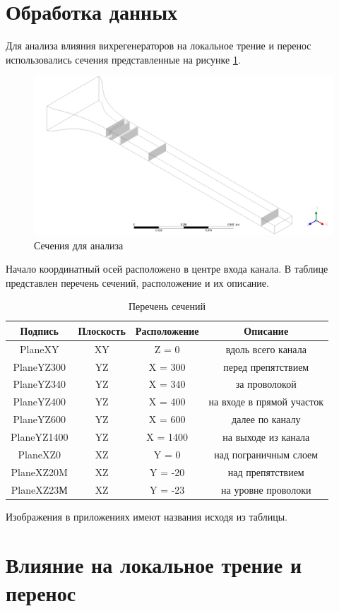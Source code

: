 \section{Обработка данных}
	
	Для анализа влияния вихрегенераторов на локальное трение и перенос использовались сечения представленные на рисунке \ref{fig:planesforanalysis}. 
	\begin{figure}[H]
		\centering
		\includegraphics[width=0.9\linewidth]{../Assets/1}
		\caption{Сечения для анализа}
		\label{fig:planesforanalysis}
	\end{figure}
	
	Начало координатный осей расположено в центре входа канала. В таблице представлен перечень сечений, расположение и их описание. %
	\begin{table}[H]
		\begin{center}
			\begin{tabular}{|c|c|c|c|}
				\hline
				Подпись & Плоскость & Расположение & Описание\\
				\hline
				PlaneXY & XY & Z = 0 & вдоль всего канала\\
				\hline
				PlaneYZ300 & YZ & X = 300 & перед препятствием\\
				\hline
				PlaneYZ340 & YZ & X = 340 & за проволокой\\
				\hline
				PlaneYZ400 & YZ & X = 400 & на входе в прямой участок\\
				\hline
				PlaneYZ600 & YZ & X = 600 & далее по каналу\\
				\hline
				PlaneYZ1400 & YZ & X = 1400 & на выходе из канала\\
				\hline
				PlaneXZ0 & XZ & Y = 0 & над пограничным слоем\\
				\hline
				PlaneXZ20M & XZ & Y = -20 & над препятствием\\
				\hline
				PlaneXZ23М & XZ & Y = -23 & на уровне проволоки\\
				\hline
			\end{tabular}
		\end{center}
		\caption{Перечень сечений}
	\end{table}
	Изображения в приложениях имеют названия исходя из таблицы.
\section{Влияние на локальное трение и перенос}